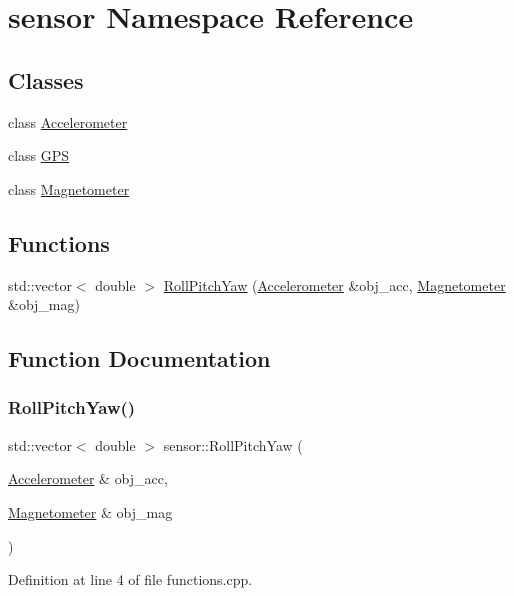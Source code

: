\hypertarget{namespacesensor}{}\section{sensor Namespace Reference}
\label{namespacesensor}
\subsection*{Classes}
\begin{DoxyCompactItemize}
\item 
class \hyperlink{classsensor_1_1_accelerometer}{Accelerometer}
\item 
class \hyperlink{classsensor_1_1_g_p_s}{G\+PS}
\item 
class \hyperlink{classsensor_1_1_magnetometer}{Magnetometer}
\end{DoxyCompactItemize}
\subsection*{Functions}
\begin{DoxyCompactItemize}
\item 
std\+::vector$<$ double $>$ \hyperlink{namespacesensor_a8d403ba02d81030a8c321487632d6dfd}{Roll\+Pitch\+Yaw} (\hyperlink{classsensor_1_1_accelerometer}{Accelerometer} \&obj\+\_\+acc, \hyperlink{classsensor_1_1_magnetometer}{Magnetometer} \&obj\+\_\+mag)
\end{DoxyCompactItemize}


\subsection{Function Documentation}
\mbox{\label{namespacesensor_a8d403ba02d81030a8c321487632d6dfd}} 
\subsubsection{\texorpdfstring{Roll\+Pitch\+Yaw()}{RollPitchYaw()}}
{\footnotesize\ttfamily std\+::vector$<$ double $>$ sensor\+::\+Roll\+Pitch\+Yaw (\begin{DoxyParamCaption}\item[{\hyperlink{classsensor_1_1_accelerometer}{Accelerometer} \&}]{obj\+\_\+acc,  }\item[{\hyperlink{classsensor_1_1_magnetometer}{Magnetometer} \&}]{obj\+\_\+mag }\end{DoxyParamCaption})}



Definition at line 4 of file functions.\+cpp.

